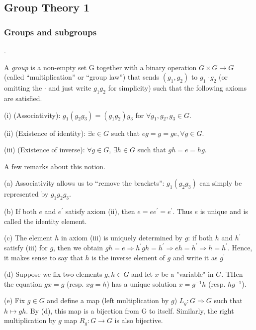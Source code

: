 

\subsection{Group Theory 1}
\subsubsection{Groups and subgroups}.
\begin{definition}
    A \emph{group} is a non-empty set G together with a binary operation $G \times G \rightarrow G$ (called
“multiplication” or “group law”) that sends $(g_1, g_2)$ to $ g_1 \cdot g_2$ (or omitting the $\cdot$ and just
write $g_1g_2$ for simplicity) such that the following axioms are satisfied.

(i) (Associativity): $g_1(g_2g_3) = (g_1 g_2)g_3$ for $\forall g_1, g_2, g_3 \in G$.

(ii) (Existence of identity): $\exists e \in G$ such that $eg = g = ge, \forall g \in G$.

(iii) (Existence of inverse): $\forall g \in G$, $\exists h \in G$ such that $gh = e = hg$.
\end{definition}

\begin{remark}
    A few remarks about this notion.

    (a) Associativity allows us to “remove the brackets”: $g_1(g_2g_3)$ can simply be represented by $g_1g_2g_3$.

(b) If both $e$ and $e^{\prime}$
satisfy axiom (ii), then $e = ee^{\prime} = e^{\prime}$. Thus $e$ is unique and is called
the identity element.

(c) The element $h$ in axiom (iii) is uniquely determined by $g$: if both $h$ and $h^{\prime}$ satisfy (iii) for $g$, then we obtain $gh = e \Rightarrow h^{\prime}gh=h^{\prime}\Rightarrow eh=h^{\prime}\Rightarrow h=h^{\prime}$. Hence, it makes
sense to say that $h$ is the inverse element of $g$ and write it as $g^{\prime}$

(d) Suppose we fix two elements $g,h \in G$ and let $x$ be a "variable" in $G$. THen the equation $gx=g$ (resp. $xg=h$) has a unique solution $x = g^{-1}h$ (resp. $hg^{-1}$).

(e) Fix $g \in G$ and define a map (left multiplication by $g$) $L_g : G \Rightarrow G$ such that $h \mapsto gh$.
By (d), this map is a bijection from G to itself. Similarly, the right multiplication
by $g$ map $R_g : G \rightarrow G$ is also bijective.
\end{remark}

